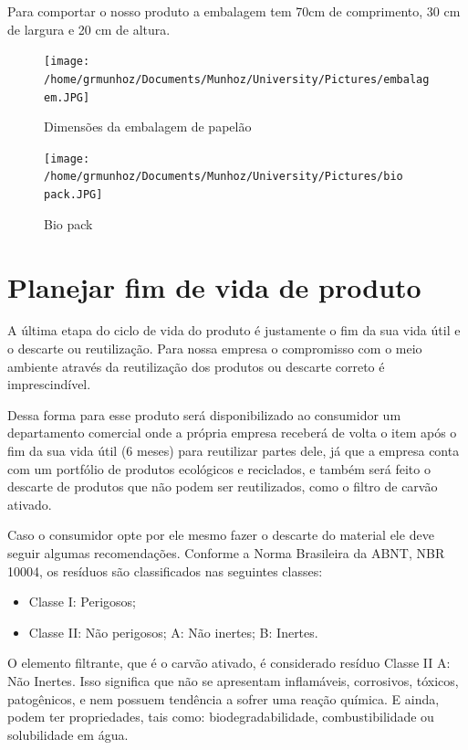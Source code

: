 \documentclass[
	12pt,				%
	openright,			%
	oneside,			%
	a4paper,			%
	english,			%
	french,				%
	spanish,			%
	brazil				%
	]{abntex2}
\begin{document}
Para comportar o nosso produto a embalagem tem 70cm de comprimento, 30 cm de largura e 20 cm de altura.

\begin{figure}[H]
\begin{center}
\caption{Dimensões da embalagem de papelão}
\texttt{[image: /home/grmunhoz/Documents/Munhoz/University/Pictures/embalagem.JPG]} 
\label{figetapas}
\end{center}
\end{figure}

\begin{figure}[H]
\begin{center}
\caption{Bio pack}
\texttt{[image: /home/grmunhoz/Documents/Munhoz/University/Pictures/bio pack.JPG]} 
\label{figetapas}
\end{center}
\end{figure}


\section{Planejar fim de vida de produto}

A última etapa do ciclo de vida do produto é justamente o fim da sua vida útil e o descarte ou reutilização. Para nossa empresa o compromisso com o meio ambiente através da reutilização dos produtos ou descarte correto é imprescindível.

Dessa forma para esse produto será disponibilizado ao consumidor um departamento comercial onde a própria empresa receberá de volta o item após o fim da sua vida útil (6 meses) para reutilizar partes dele, já que a empresa conta com um portfólio de produtos ecológicos e reciclados, e também será feito o descarte de produtos que não podem ser reutilizados, como o filtro de carvão ativado.

Caso o consumidor opte por ele mesmo fazer o descarte do material ele deve seguir algumas recomendações. Conforme a Norma Brasileira da ABNT, NBR 10004, os resíduos são classificados nas seguintes classes:

\begin{itemize}
\item Classe I: Perigosos;
\item Classe II: Não perigosos;
\subitem A: Não inertes;
\subitem B: Inertes.
\end{itemize}

O elemento filtrante, que é o carvão ativado, é considerado resíduo Classe II A: Não Inertes. Isso significa que não se apresentam inflamáveis, corrosivos, tóxicos, patogênicos, e nem possuem tendência a sofrer uma reação química. E ainda, podem ter propriedades, tais como: biodegradabilidade, combustibilidade ou solubilidade em água.
\end{document}
